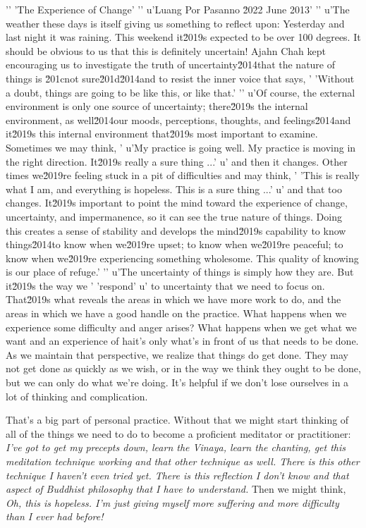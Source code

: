 '\n'
'The Experience of Change'
'\n'
u'Luang Por Pasanno \u2022 June 2013'
'\n'
u'The weather these days is itself giving us something to reflect upon: Yesterday and last night it was raining. This weekend it\u2019s expected to be over 100 degrees. It should be obvious to us that this is definitely uncertain! Ajahn Chah kept encouraging us to investigate the truth of uncertainty\u2014that the nature of things is \u201cnot sure\u201d\u2014and to resist the inner voice that says, '
'Without a doubt, things are going to be like this, or like that.'
'\n'
u'Of course, the external environment is only one source of uncertainty; there\u2019s the internal environment, as well\u2014our moods, perceptions, thoughts, and feelings\u2014and it\u2019s this internal environment that\u2019s most important to examine. Sometimes we may think, '
u'My practice is going well. My practice is moving in the right direction. It\u2019s really a sure thing ...'
u' and then it changes. Other times we\u2019re feeling stuck in a pit of difficulties and may think, '
'This is really what I am, and everything is hopeless. This is a sure thing ...'
u' and that too changes. It\u2019s important to point the mind toward the experience of change, uncertainty, and impermanence, so it can see the true nature of things. Doing this creates a sense of stability and develops the mind\u2019s capability to know things\u2014to know when we\u2019re upset; to know when we\u2019re peaceful; to know when we\u2019re experiencing something wholesome. This quality of knowing is our place of refuge.'
'\n'
u'The uncertainty of things is simply how they are. But it\u2019s the way we '
'respond'
u' to uncertainty that we need to focus on. That\u2019s what reveals the areas in which we have more work to do, and the areas in which we have a good handle on the practice. What happens when we experience some difficulty and anger arises? What happens when we get what we want and an experience of hait's only what's in front of us that needs to be done. As 
we maintain that perspective, we realize that things do get done. They 
may not get done as quickly as we wish, or in the way we think they 
ought to be done, but we can only do what we're doing. It's helpful if 
we don't lose ourselves in a lot of thinking and complication.

That's a big part of personal practice. Without that we might start 
thinking of all of the things we need to do to become a proficient 
meditator or practitioner: \emph{I've got to get my precepts down, 
learn the Vinaya, learn the chanting, get this meditation technique 
working and that other technique as well. There is this other technique 
I haven't even tried yet. There is this reflection I don't know and 
that aspect of Buddhist philosophy that I have to understand.} Then we 
might think, \emph{Oh, this is hopeless. I'm just giving myself more 
suffering and more difficulty than I ever had before!}

